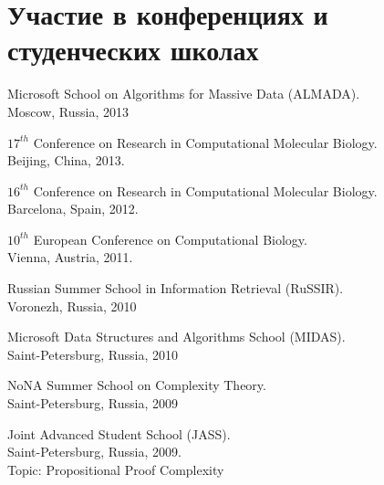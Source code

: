 \section{Участие в конференциях и студенческих школах}
%
\begin{innerlist}

\item Microsoft School on Algorithms for Massive Data (ALMADA). \\
Moscow, Russia, 2013

\item $17^{th}$ Conference on Research in Computational Molecular Biology.\\ 
Beijing, China, 2013.

\item $16^{th}$ Conference on Research in Computational Molecular Biology.\\ 
Barcelona, Spain, 2012.

\item $10^{th}$ European Conference on Computational Biology.\\ 
Vienna, Austria, 2011.

\item Russian Summer School in Information Retrieval (RuSSIR).\\ 
Voronezh, Russia, 2010

\item Microsoft Data Structures and Algorithms School (MIDAS).\\ 
Saint-Petersburg, Russia, 2010

\item NoNA Summer School on Complexity Theory.\\
Saint-Petersburg, Russia, 2009

\item Joint Advanced Student School (JASS).\\
Saint-Petersburg, Russia, 2009.\\ 
Topic: Propositional Proof Complexity

\end{innerlist}
